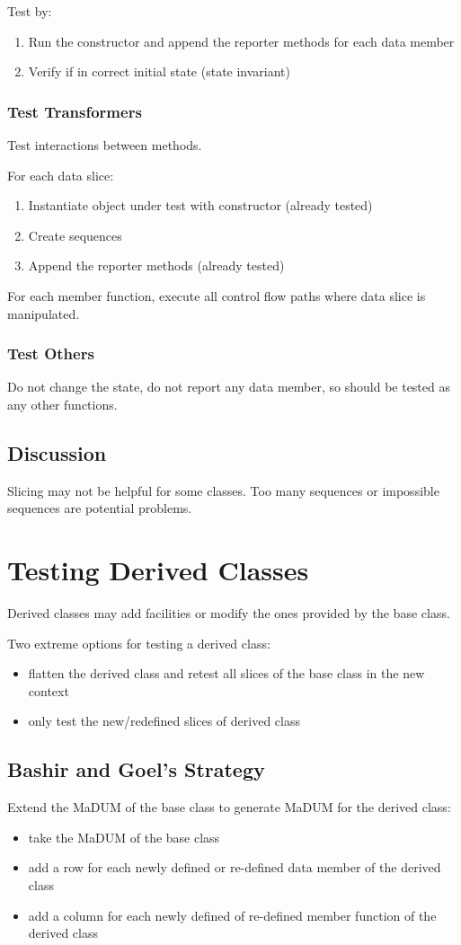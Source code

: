 \documentclass[11pt]{article}
\begin{document}
Test by:
\begin{enumerate}
\item Run the constructor and append the reporter methods for
each data member
\item Verify if in correct initial state (state invariant)
\end{enumerate}
\subsubsection{Test Transformers}
\label{sec:org9385b65}
Test interactions between methods.

For each data slice:
\begin{enumerate}
\item Instantiate object under test with constructor (already tested)
\item Create sequences
\item Append the reporter methods (already tested)
\end{enumerate}

For each member function, execute all control flow paths where
data slice is manipulated.
\subsubsection{Test Others}
\label{sec:org51e886a}
Do not change the state, do not report any data member,
so should be tested as any other functions.
\subsection{Discussion}
\label{sec:orga58745a}
Slicing may not be helpful for some classes.
Too many sequences or impossible sequences are potential problems.
\section{Testing Derived Classes}
\label{sec:org0def790}
Derived classes may add facilities or modify the ones provided by the
base class.

Two extreme options for testing a derived class:
\begin{itemize}
\item flatten the derived class and retest all slices of the base class
in the new context
\item only test the new/redefined slices of derived class
\end{itemize}
\subsection{Bashir and Goel's Strategy}
\label{sec:orge452332}
Extend the MaDUM of the base class to generate MaDUM for the derived
class:
\begin{itemize}
\item take the MaDUM of the base class
\item add a row for each newly defined or re-defined data member of the
derived class
\item add a column for each newly defined of re-defined member
function of the derived class
\end{itemize}
\end{document}
